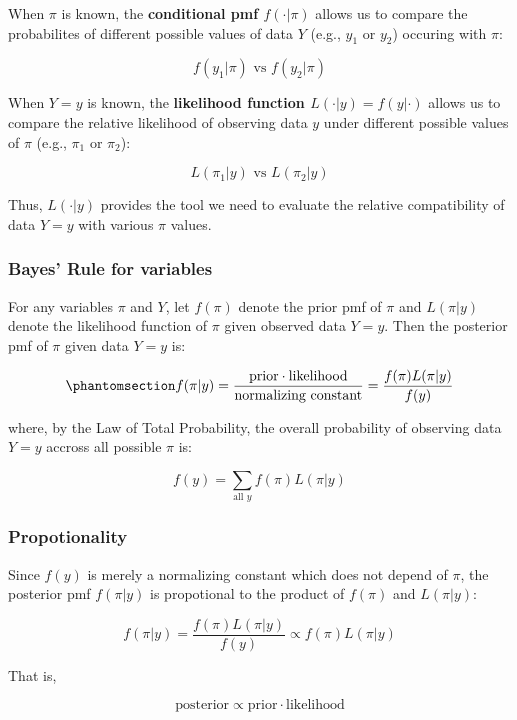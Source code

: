 \documentclass[
  letterpaper,
  DIV=11,
  numbers=noendperiod]{scrartcl}
\theoremstyle{definition}
\theoremstyle{remark}
\begin{document}
When \(\pi\) is known, the \textbf{conditional pmf \(f(\cdot | \pi)\)}
allows us to compare the probabilites of different possible values of
data \(Y\) (e.g., \(y_1\) or \(y_2\)) occuring with \(\pi\):

\[
f(y_1|\pi) \text{ vs } f(y_2|\pi)
\]

When \(Y = y\) is known, the \textbf{likelihood function
\(L(\cdot|y) = f(y|\cdot)\)} allows us to compare the relative
likelihood of observing data \(y\) under different possible values of
\(\pi\) (e.g., \(\pi_1\) or \(\pi_2\)):

\[
L(\pi_1|y) \text{ vs } L(\pi_2|y)
\]

Thus, \(L(\cdot|y)\) provides the tool we need to evaluate the relative
compatibility of data \(Y = y\) with various \(\pi\) values.

\subsubsection{Bayes' Rule for
variables}\label{bayes-rule-for-variables}

For any variables \(\pi\) and \(Y\), let \(f(\pi)\) denote the prior pmf
of \(\pi\) and \(L(\pi|y)\) denote the likelihood function of \(\pi\)
given observed data \(Y=y\). Then the posterior pmf of \(\pi\) given
data \(Y = y\) is:

\begin{equation}\phantomsection\label{eq-2.12}{
f(\pi | y) = \frac{\text{prior} \cdot \text{likelihood}}{\text{normalizing constant}} = \frac{f(\pi) L(\pi|y)}{f(y)}
}\end{equation}

where, by the Law of Total Probability, the overall probability of
observing data \(Y = y\) accross all possible \(\pi\) is:

\[
f(y) = \sum_{\text{all } y} f(\pi) L(\pi|y)
\]

\subsubsection{Propotionality}\label{propotionality}

Since \(f(y)\) is merely a normalizing constant which does not depend of
\(\pi\), the posterior pmf \(f(\pi|y)\) is propotional to the product of
\(f(\pi)\) and \(L(\pi|y)\):

\[
f(\pi | y) = \frac{f(\pi) L(\pi|y)}{f(y)} \propto f(\pi)L(\pi|y)
\]

That is,

\[
\text{posterior} \propto \text{prior} \cdot \text{likelihood}
\]
\end{document}
